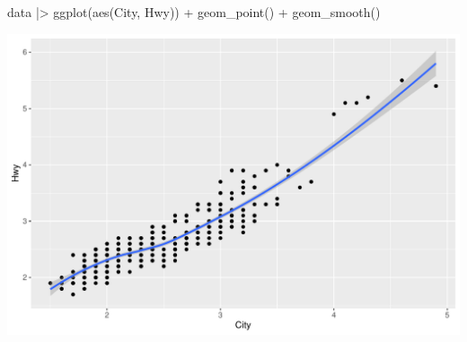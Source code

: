 \begin{samepage}
\begin{Rcode}
data |>
  ggplot(aes(City, Hwy)) +
    geom_point() +
    geom_smooth()
\end{Rcode}
\end{samepage}

\begin{center}
  \includegraphics[width=.8\textwidth]{fuel.linesSmooth.pdf}
\end{center}






